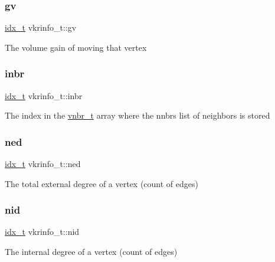 \subsubsection{\texorpdfstring{gv}{gv}}
{\footnotesize\ttfamily \hyperlink{3rd_party_2parmetis-4_80_83_2metis_2include_2metis_8h_aaa5262be3e700770163401acb0150f52}{idx\+\_\+t} vkrinfo\+\_\+t\+::gv}

The volume gain of moving that vertex \mbox{\label{structvkrinfo__t_a85a0150ff0f0fe87b0fc3bf445b60bca}} 
\subsubsection{\texorpdfstring{inbr}{inbr}}
{\footnotesize\ttfamily \hyperlink{3rd_party_2parmetis-4_80_83_2metis_2include_2metis_8h_aaa5262be3e700770163401acb0150f52}{idx\+\_\+t} vkrinfo\+\_\+t\+::inbr}

The index in the \hyperlink{structvnbr__t}{vnbr\+\_\+t} array where the nnbrs list of neighbors is stored \mbox{\label{structvkrinfo__t_a0af0fec11cab7aa7a343c268832cc709}} 
\subsubsection{\texorpdfstring{ned}{ned}}
{\footnotesize\ttfamily \hyperlink{3rd_party_2parmetis-4_80_83_2metis_2include_2metis_8h_aaa5262be3e700770163401acb0150f52}{idx\+\_\+t} vkrinfo\+\_\+t\+::ned}

The total external degree of a vertex (count of edges) \mbox{\label{structvkrinfo__t_a9befff2ea2c811563ad38aaf921a8f21}} 
\subsubsection{\texorpdfstring{nid}{nid}}
{\footnotesize\ttfamily \hyperlink{3rd_party_2parmetis-4_80_83_2metis_2include_2metis_8h_aaa5262be3e700770163401acb0150f52}{idx\+\_\+t} vkrinfo\+\_\+t\+::nid}

The internal degree of a vertex (count of edges) \mbox{\label{structvkrinfo__t_aa337d338d253918348c5ba9e4a5082ca}} 
